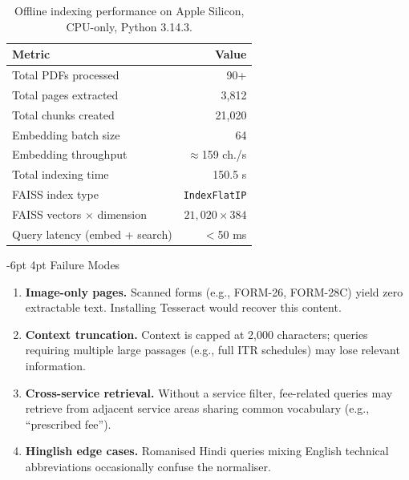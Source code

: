 \documentclass[10pt,twocolumn]{article}
\makeatletter
\renewcommand{\subsection}{\@startsection{subsection}{2}{\z@}%
  {-6pt \@plus -1pt \@minus -0.5pt}%
  {4pt \@plus 0.2pt}%
  {\normalfont\large\bfseries}}
\newcommand{\tightlist}{\setlength{\itemsep}{1pt}\setlength{\topsep}{2pt}\setlength{\parsep}{0pt}}
\makeatother
\begin{document}
\begin{table}[ht]
\centering
\small
\caption{Offline indexing performance on Apple Silicon, CPU-only, Python 3.14.3.}
\label{tab:perf}
\begin{tabular}{lr}
\toprule
\textbf{Metric}                  & \textbf{Value}      \\
\midrule
Total PDFs processed             & 90+                 \\
Total pages extracted            & 3,812               \\
Total chunks created             & 21,020              \\
Embedding batch size             & 64                  \\
Embedding throughput             & $\approx$159 ch./s  \\
Total indexing time              & 150.5 s             \\
FAISS index type                 & \texttt{IndexFlatIP}\\
FAISS vectors $\times$ dimension & $21{,}020\times384$ \\
Query latency (embed + search)   & $<$50 ms            \\
\bottomrule
\end{tabular}
\end{table}

\subsection{Failure Modes}

\begin{enumerate}
  \tightlist
  \item \textbf{Image-only pages.}  Scanned forms (e.g., FORM-26, FORM-28C) yield
    zero extractable text.  Installing Tesseract would recover this content.
  \item \textbf{Context truncation.}  Context is capped at 2,000 characters; queries
    requiring multiple large passages (e.g., full ITR schedules) may lose relevant
    information.
  \item \textbf{Cross-service retrieval.}  Without a service filter, fee-related
    queries may retrieve from adjacent service areas sharing common vocabulary
    (e.g., ``prescribed fee'').
  \item \textbf{Hinglish edge cases.}  Romanised Hindi queries mixing English
    technical abbreviations occasionally confuse the normaliser.
\end{enumerate}
\end{document}
